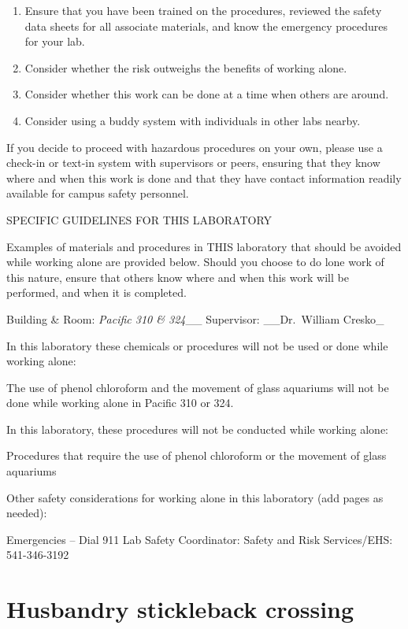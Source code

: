 \documentclass[
]{book}
\providecommand{\tightlist}{%
  \setlength{\itemsep}{0pt}\setlength{\parskip}{0pt}}
\begin{document}
\begin{enumerate}
\def\labelenumi{\arabic{enumi}.}
\tightlist
\item
  Ensure that you have been trained on the procedures, reviewed the safety data sheets for all associate materials, and know the emergency procedures for your lab.
\item
  Consider whether the risk outweighs the benefits of working alone.
\item
  Consider whether this work can be done at a time when others are around.
\item
  Consider using a buddy system with individuals in other labs nearby.
\end{enumerate}

If you decide to proceed with hazardous procedures on your own, please use a check-in or text-in system with supervisors or peers, ensuring that they know where and when this work is done and that they have contact information readily available for campus safety personnel.

SPECIFIC GUIDELINES FOR THIS LABORATORY

Examples of materials and procedures in THIS laboratory that should be avoided while working alone are provided below. Should you choose to do lone work of this nature, ensure that others know where and when this work will be performed, and when it is completed.

Building \& Room: \emph{Pacific 310 \& 324}\_\_ Supervisor: \_\_Dr.~William Cresko\_

In this laboratory these chemicals or procedures will not be used or done while working alone:

The use of phenol chloroform and the movement of glass aquariums will not be done while working alone in Pacific 310 or 324.

In this laboratory, these procedures will not be conducted while working alone:

Procedures that require the use of phenol chloroform or the movement of glass aquariums

Other safety considerations for working alone in this laboratory (add pages as needed):

Emergencies -- Dial 911
Lab Safety Coordinator:
Safety and Risk Services/EHS: 541-346-3192

\hypertarget{husbandry-stickleback-crossing}{%
\chapter{Husbandry stickleback crossing}\label{husbandry-stickleback-crossing}}
\end{document}
